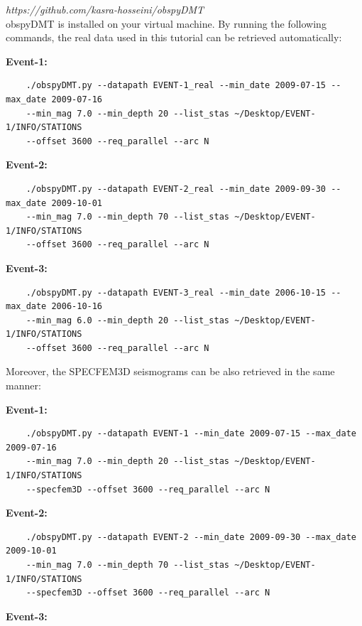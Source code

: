\documentclass{article}
\begin{document}
{\color{color18} \emph{https://github.com/kasra-hosseini/obspyDMT}}  \\

obspyDMT is installed on your virtual machine. By running the following commands, 
the real data used in this tutorial can be retrieved automatically:

\textbf{Event-1:}

\begin{verbatim}
    ./obspyDMT.py --datapath EVENT-1_real --min_date 2009-07-15 --max_date 2009-07-16 
    --min_mag 7.0 --min_depth 20 --list_stas ~/Desktop/EVENT-1/INFO/STATIONS 
    --offset 3600 --req_parallel --arc N
\end{verbatim}

\textbf{Event-2:}

\begin{verbatim}
    ./obspyDMT.py --datapath EVENT-2_real --min_date 2009-09-30 --max_date 2009-10-01 
    --min_mag 7.0 --min_depth 70 --list_stas ~/Desktop/EVENT-1/INFO/STATIONS 
    --offset 3600 --req_parallel --arc N
\end{verbatim}

\textbf{Event-3:}

\begin{verbatim}
    ./obspyDMT.py --datapath EVENT-3_real --min_date 2006-10-15 --max_date 2006-10-16 
    --min_mag 6.0 --min_depth 20 --list_stas ~/Desktop/EVENT-1/INFO/STATIONS 
    --offset 3600 --req_parallel --arc N
\end{verbatim}

Moreover, the SPECFEM3D seismograms can be also retrieved in the same manner:

\textbf{Event-1:}

\begin{verbatim}
    ./obspyDMT.py --datapath EVENT-1 --min_date 2009-07-15 --max_date 2009-07-16 
    --min_mag 7.0 --min_depth 20 --list_stas ~/Desktop/EVENT-1/INFO/STATIONS 
    --specfem3D --offset 3600 --req_parallel --arc N
\end{verbatim}

\textbf{Event-2:}

\begin{verbatim}
    ./obspyDMT.py --datapath EVENT-2 --min_date 2009-09-30 --max_date 2009-10-01 
    --min_mag 7.0 --min_depth 70 --list_stas ~/Desktop/EVENT-1/INFO/STATIONS 
    --specfem3D --offset 3600 --req_parallel --arc N
\end{verbatim}

\textbf{Event-3:}
\end{document}
